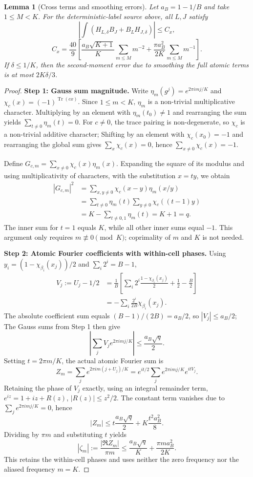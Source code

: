 \documentclass[a4paper,11pt]{article}
\newtheorem{lemma}{Lemma}[section]
\theoremstyle{remark}
\begin{document}
\begin{lemma}[Cross terms and smoothing errors]\label{lem:papercross}
Let $a_B=1-1/B$ and take $1\le M<K$. For the deterministic-label source above, all $L,J$ satisfy
\[
 \left|\int(H_{L,\delta}B_J+B_LH_{J,\delta})\right|\le C_x,
\]
\[
 C_x=\frac{40}{9}\left[
 \frac{a_B\sqrt{K+1}}K\sum_{m\le M}m^{-2}
 +\frac{\pi a_B^2}{2K}\sum_{m\le M}m^{-1}\right].
\]
If $\delta\le1/K$, then the second-moment error due to smoothing the full atomic terms is at most $2K\delta/3$.
\end{lemma}
\begin{proof}
\textbf{Step 1: Gauss sum magnitude.}
Write $\eta_m(g^j)=e^{2\pi imj/K}$ and $\chi_c(x)=(-1)^{\operatorname{Tr}(cx)}$.
Since $1 \le m < K$, $\eta_m$ is a non-trivial multiplicative character.
Multiplying by an element with $\eta_m(t_0) \neq 1$ and rearranging the sum yields
$\sum_{t\ne0}\eta_m(t)=0$.
For $c \neq 0$, the trace pairing is non-degenerate, so $\chi_c$ is a non-trivial additive character;
Shifting by an element with $\chi_c(x_0) = -1$ and rearranging the global sum gives
$\sum_x \chi_c(x) = 0$, hence $\sum_{x \neq 0} \chi_c(x) = -1$.

Define $G_{c,m} = \sum_{x \neq 0} \chi_c(x) \eta_m(x)$.
Expanding the square of its modulus and using multiplicativity of characters, with the substitution $x = ty$, we obtain
\begin{align*}
 |G_{c,m}|^2
 &=\sum_{x,y\ne0}\chi_c(x-y)\eta_m(x/y)\\
 &=\sum_{t\ne0}\eta_m(t)\sum_{y\ne0}\chi_c((t-1)y)\\
 &=K-\sum_{t\ne0,1}\eta_m(t)=K+1=q.
\end{align*}
The inner sum for $t=1$ equals $K$, while all other inner sums equal $-1$.
This argument only requires $m \not\equiv 0 \pmod K$; coprimality of $m$ and $K$ is not needed.

\textbf{Step 2: Atomic Fourier coefficients with within-cell phases.}
Using $y_i = (1 - \chi_{\beta_i}(x_j))/2$ and $\sum_i 2^i = B-1$,
\begin{align*}
 V_j:=U_j-1/2
 &=\frac1B\left[\sum_i2^i\frac{1-\chi_{\beta_i}(x_j)}2
 +\frac12-\frac B2\right]\\
 &=-\sum_i\frac{2^i}{2B}\chi_{\beta_i}(x_j).
\end{align*}
The absolute coefficient sum equals $(B-1)/(2B) = a_B/2$, so $|V_j| \leq a_B/2$;
The Gauss sums from Step 1 then give
\[
 \left|\sum_jV_je^{2\pi imj/K}\right|
 \le\frac{a_B\sqrt q}{2}.
\]
Setting $t = 2\pi m/K$, the actual atomic Fourier sum is
\[
 Z_m=\sum_je^{2\pi im(j+U_j)/K}
 =e^{it/2}\sum_je^{2\pi imj/K}e^{itV_j}.
\]
Retaining the phase of $V_j$ exactly, using an integral remainder term,
$e^{iz}=1+iz+R(z)$, $|R(z)|\le z^2/2$.
The constant term vanishes due to $\sum_j e^{2\pi i mj/K} = 0$, hence
\[
 |Z_m|\le t\frac{a_B\sqrt q}{2}+K\frac{t^2a_B^2}{8}.
\]
Dividing by $\pi m$ and substituting $t$ yields
\[
 |\zeta_m|:=\frac{|\Re Z_m|}{\pi m}
 \le\frac{a_B\sqrt q}{K}+\frac{\pi m a_B^2}{2K}.
\]
This retains the within-cell phases and uses neither the zero frequency nor the aliased frequency $m=K$.


\end{proof}
\end{document}
